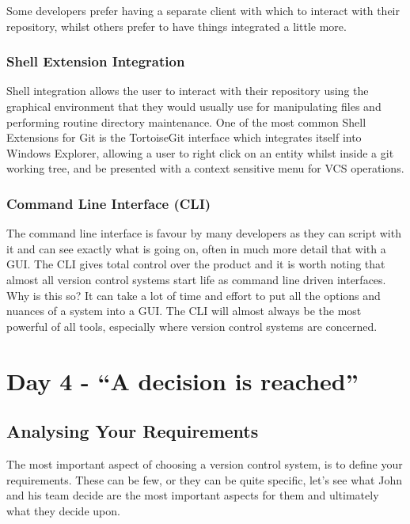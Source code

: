 Some developers prefer having a separate client with which to interact with their repository, whilst others prefer to have things integrated a little more.

\subsubsection{Shell Extension Integration}

Shell integration allows the user to interact with their repository using the graphical environment that they would usually use for manipulating files and performing routine directory maintenance.  One of the most common Shell Extensions for Git is the TortoiseGit interface which integrates itself into Windows Explorer, allowing a user to right click on an entity whilst inside a git working tree, and be presented with a context sensitive menu for VCS operations.

\subsubsection{Command Line Interface (CLI)}

The command line interface is favour by many developers as they can script with it and can see exactly what is going on, often in much more detail that with a GUI.  The CLI gives total control over the product and it is worth noting that almost all version control systems start life as command line driven interfaces.  Why is this so?  It can take a lot of time and effort to put all the options and nuances of a system into a GUI.  The CLI will almost always be the most powerful of all tools, especially where version control systems are concerned.

\section{Day 4 - ``A decision is reached''}

\subsection{Analysing Your Requirements}

The most important aspect of choosing a version control system, is to define your requirements.  These can be few, or they can be quite specific, let's see what John and his team decide are the most important aspects for them and ultimately what they decide upon.


